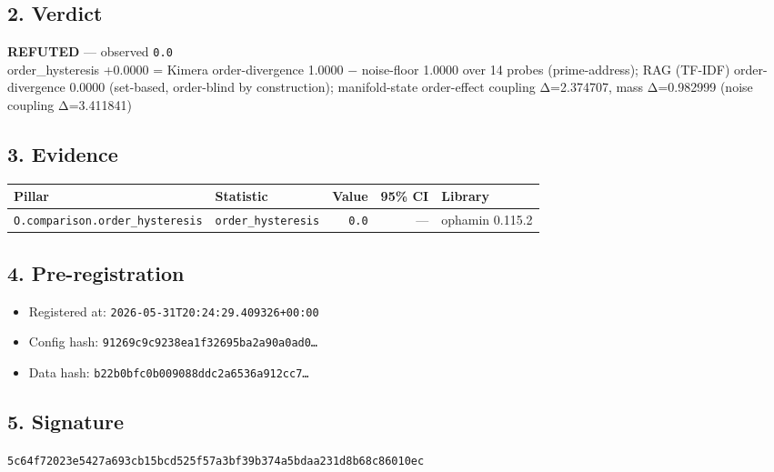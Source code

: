 \documentclass{article}
\begin{document}
\subsection*{2. Verdict}
\textcolor{refuted}{\textbf{REFUTED}} --- observed \texttt{0.0}\\
order\_hysteresis +0.0000 = Kimera order-divergence 1.0000 − noise-floor 1.0000 over 14 probes (prime-address); RAG (TF-IDF) order-divergence 0.0000 (set-based, order-blind by construction); manifold-state order-effect coupling Δ=2.374707, mass Δ=0.982999 (noise coupling Δ=3.411841)
\subsection*{3. Evidence}
\begin{tabular}{llrrl}\toprule
\textbf{Pillar} & \textbf{Statistic} & \textbf{Value} & \textbf{95\% CI} & \textbf{Library} \\\midrule
\texttt{O.comparison.order\_hysteresis} & \texttt{order\_hysteresis} & \texttt{0.0} & --- & ophamin 0.115.2 \\
\bottomrule\end{tabular}
\subsection*{4. Pre-registration}
\begin{itemize}
\item Registered at: \texttt{2026-05-31T20:24:29.409326+00:00}
\item Config hash: \texttt{91269c9c9238ea1f32695ba2a90a0ad0\dots}
\item Data hash: \texttt{b22b0bfc0b009088ddc2a6536a912cc7\dots}
\end{itemize}
\subsection*{5. Signature}
\texttt{5c64f72023e5427a693cb15bcd525f57a3bf39b374a5bdaa231d8b68c86010ec}\\
\end{document}
